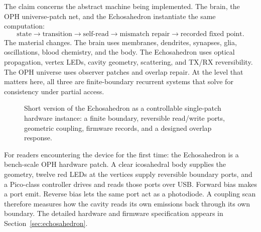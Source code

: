 \documentclass[11pt]{article}
\theoremstyle{remark}
\theoremstyle{plain}
\begin{document}
The claim concerns the abstract machine being implemented. The brain, the OPH universe-patch net, and the Echosahedron instantiate the same computation:
\[
\boxed{
\text{state}
\longrightarrow
\text{transition}
\longrightarrow
\text{self-read}
\longrightarrow
\text{mismatch repair}
\longrightarrow
\text{recorded fixed point}.
}
\]
The material changes. The brain uses membranes, dendrites, synapses, glia, oscillations, blood chemistry, and the body. The Echosahedron uses optical propagation, vertex LEDs, cavity geometry, scattering, and TX/RX reversibility. The OPH universe uses observer patches and overlap repair. At the level that matters here, all three are finite-boundary recurrent systems that solve for consistency under partial access.

\begin{figure}[ht]
\centering
{}
\caption{Short version of the Echosahedron as a controllable single-patch hardware instance: a finite boundary, reversible read/write ports, geometric coupling, firmware records, and a designed overlap response.}
\label{fig:echosahedron-short}
\end{figure}

For readers encountering the device for the first time: the Echosahedron is a bench-scale OPH hardware patch. A clear icosahedral body supplies the geometry, twelve red LEDs at the vertices supply reversible boundary ports, and a Pico-class controller drives and reads those ports over USB. Forward bias makes a port emit. Reverse bias lets the same port act as a photodiode. A coupling scan therefore measures how the cavity reads its own emissions back through its own boundary. The detailed hardware and firmware specification appears in Section~\ref{sec:echosahedron}.
\end{document}
